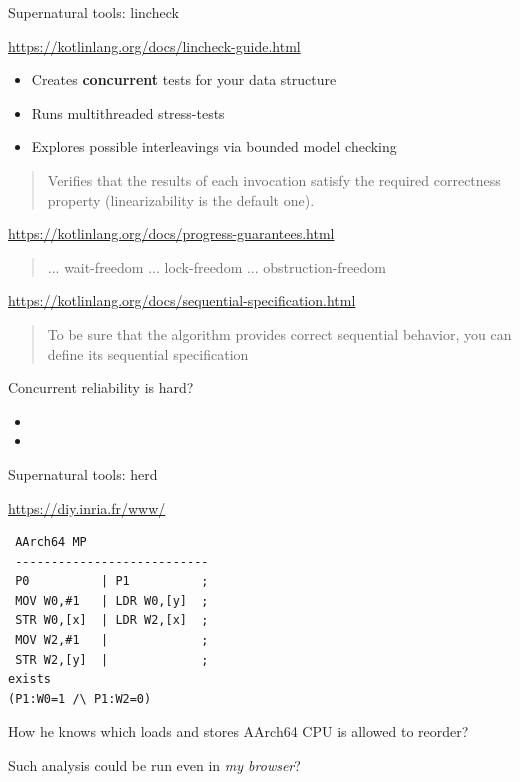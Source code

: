 
\begin{frame}{Supernatural tools: lincheck}

{\small\url{https://kotlinlang.org/docs/lincheck-guide.html}}
\begin{itemize}
  \item Creates \textbf{concurrent} tests for your data structure
  \item Runs multithreaded stress-tests
  \item Explores possible interleavings via bounded model checking
\end{itemize}

\pause

\begin{quote}
  Verifies that the results of each invocation satisfy the required correctness property (linearizability is the default one).
\end{quote}

\pause
{\small\url{https://kotlinlang.org/docs/progress-guarantees.html}}
\begin{quote}
  ... wait-freedom ... lock-freedom ... obstruction-freedom
\end{quote}

\pause
{\small\url{https://kotlinlang.org/docs/sequential-specification.html}}
\begin{quote}
  To be sure that the algorithm provides correct sequential behavior, you can define its sequential specification
\end{quote}
\end{frame}

\begin{frame}{Concurrent reliability is hard?}
\begin{itemize}
  \item \alarmOne
  \item \alarmThree  
\end{itemize}
\end{frame}

\begin{frame}[t,fragile]{Supernatural tools: herd}

{\small\url{https://diy.inria.fr/www/}}

\begin{verbatim}
 AArch64 MP
 ---------------------------
 P0          | P1          ;
 MOV W0,#1   | LDR W0,[y]  ;
 STR W0,[x]  | LDR W2,[x]  ;
 MOV W2,#1   |             ;
 STR W2,[y]  |             ;
exists
(P1:W0=1 /\ P1:W2=0)
\end{verbatim}

\pause
How he knows which loads and stores AArch64 CPU is allowed to reorder?

\pause
Such analysis could be run even in \textit{my browser}?

\end{frame}



